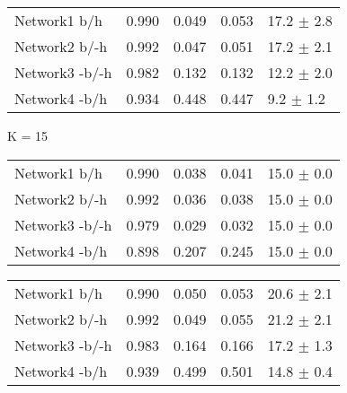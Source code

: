 \begin{table*}[h]
\begin{minipage}[h]{0.45\linewidth}
\begin{tabular}{lllll}
\hline
\end{tabular}
\end{minipage}
\hspace{0.8cm}
\begin{minipage}[h]{0.45\linewidth}
\begin{tabular}{lllll}
 Network1 b/h       &    0.990 &       0.049 &    0.053 & 17.2 $\pm$ 2.8 \\
 Network2 b/-h     &    0.992 &       0.047 &    0.051 & 17.2 $\pm$ 2.1 \\
 Network3 -b/-h     &    0.982 &       0.132 &    0.132 & 12.2 $\pm$ 2.0 \\
 Network4 -b/h     &    0.934 &       0.448 &    0.447 & 9.2 $\pm$ 1.2 \\

\hline
\end{tabular}
\end{minipage}


	\begin{minipage}[h]{0.45\linewidth} 
K = 15
\begin{tabular}{lrrrr}
 Network1 b/h         &    0.990 &       0.038 &    0.041 & 15.0 $\pm$ 0.0 \\
 Network2 b/-h       &    0.992 &       0.036 &    0.038 & 15.0 $\pm$ 0.0 \\
 Network3 -b/-h       &    0.979 &       0.029 &    0.032 & 15.0 $\pm$ 0.0 \\
 Network4 -b/h       &    0.898 &       0.207 &    0.245 & 15.0 $\pm$ 0.0 \\

\hline
\end{tabular}
\end{minipage}
\hspace{0.8cm}
\begin{minipage}[h]{0.45\linewidth}
\begin{tabular}{lrrrr}
 Network1 b/h       &    0.990 &       0.050 &    0.053 & 20.6 $\pm$ 2.1 \\
 Network2 b/-h     &    0.992 &       0.049 &    0.055 & 21.2 $\pm$ 2.1 \\
 Network3 -b/-h     &    0.983 &       0.164 &    0.166 & 17.2 $\pm$ 1.3 \\
 Network4 -b/h     &    0.939 &       0.499 &    0.501 & 14.8 $\pm$ 0.4    \\

\hline
\end{tabular}
\end{minipage}


\end{table*}
